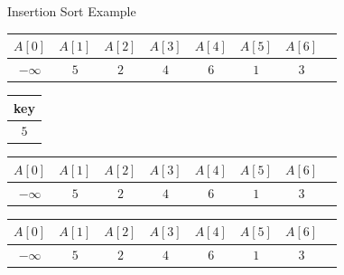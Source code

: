 \begin{frame}{Insertion Sort Example}
\vspace{1cm}
\begin{tabular}{|c|c|c|c|c|c|c|c|}
\hline
$A[0]$ & $A[1]$ & $A[2]$ & $A[3]$ & $A[4]$ & $A[5]$ & $A[6]$\\
\hline
$-\infty$ &\cellcolor{orange} $5$ & $2$ & $4$ & $6$ & $1$ & $3$ \\
\hline
\end{tabular}
\vspace{1cm}
\begin{table}[!hbt]
\begin{tabular}{|c|}
\hline key\\
\hline $5$\\
\hline
\end{tabular}\hspace{1cm}
%
\begin{tabular}{|c|c|c|c|c|c|c|c|}
\hline
$A[0]$ & $A[1]$ & $A[2]$ & $A[3]$ & $A[4]$ & $A[5]$ & $A[6]$\\
\hline
$-\infty$ &\cellcolor{orange} $5$ & $2$ & $4$ & $6$ & $1$ & $3$ \\
\hline
\end{tabular}
\end{table}


\begin{tabular}{|c|c|c|c|c|c|c|c|}
\hline
$A[0]$ & $A[1]$ & $A[2]$ & $A[3]$ & $A[4]$ & $A[5]$ & $A[6]$\\
\hline
$-\infty$ &\cellcolor{statalegreen} $5$ & $2$ & $4$ & $6$ & $1$ & $3$ \\
\hline
\end{tabular}

\end{frame}



